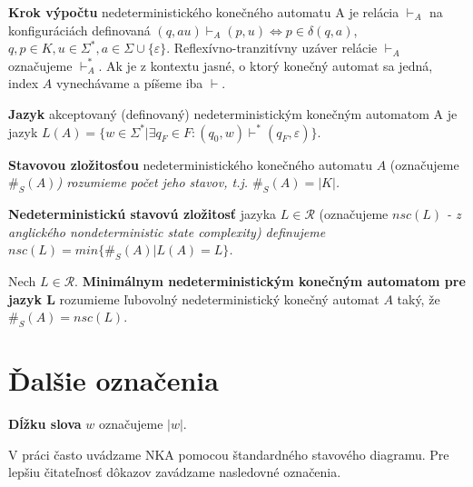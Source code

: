 \begin{definition}
\textbf{Krok výpočtu} nedeterministického konečného automatu A je relácia $ \vdash_A $ na konfiguráciách definovaná $ (q, au) \vdash_{A} (p,u) \Leftrightarrow p \in \delta(q,a) $, $q,p \in K, u \in \Sigma^*, a \in \Sigma \cup \lbrace \varepsilon \rbrace $. Reflexívno-tranzitívny uzáver relácie $ \vdash_A $ označujeme $ \vdash_{A}^{*} $. Ak je z kontextu jasné, o ktorý konečný automat sa jedná, index $ A $ vynechávame a píšeme iba $ \vdash $.
\end{definition}

\begin{definition}
\textbf{Jazyk} akceptovaný (definovaný) nedeterministickým konečným automatom A je jazyk $ L(A) = \lbrace w \in \Sigma^{*} | \exists q_F \in F: (q_0,w) \vdash^{*} (q_F, \varepsilon) \rbrace $.
\end{definition}

\begin{definition}
\textbf{Stavovou zložitosťou} nedeterministického konečného automatu $ A $ (označujeme \em{}$ \#_S(A) $\em{}) rozumieme počet jeho stavov, t.j. \em{}$ \#_S(A) = |K| $\em{}.
\end{definition}

\begin{definition}
\textbf{Nedeterministickú stavovú zložitosť} jazyka $ L \in \mathscr{R} $ (označujeme \em{}$ nsc(L) $\em{} - z anglického nondeterministic state complexity) definujeme \em{}$ nsc(L)=min \lbrace \#_S(A) | L(A)=L \rbrace $\em{}.
\end{definition}

\begin{definition}
Nech $ L \in \mathscr{R} $. \textbf{Minimálnym nedeterministickým konečným automatom pre jazyk L} rozumieme ľubovolný nedeterministický konečný automat $ A $ taký, že $ \#_S(A)=nsc(L) $.
\end{definition}

\section{Ďalšie označenia}

\begin{notation}
\textbf{Dĺžku slova} $ w $ označujeme $ |w| $.
\end{notation}

V práci často uvádzame NKA pomocou štandardného stavového diagramu. Pre lepšiu čitateľnosť dôkazov zavádzame nasledovné označenia.

